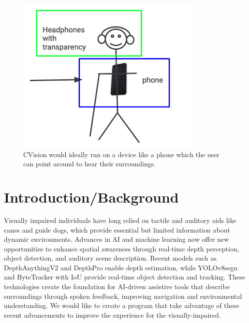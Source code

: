 \documentclass[12pt,a4paper]{article}
\begin{document}
\begin{figure}[ht!]
    \center
    \includegraphics[width=0.7\linewidth]{our_vision.png}
    \caption{CVision would ideally run on a device like a phone which the user can point around to hear their surroundings.}
    \label{our_vision}
  \end{figure}


\newpage
\section{Introduction/Background}
Visually impaired individuals have long relied on tactile and auditory aids like canes and guide dogs, which provide essential but limited information about dynamic environments.
Advances in AI and machine learning now offer new opportunities to enhance spatial awareness through real-time depth perception, object detection, and auditory scene description.
Recent models such as DepthAnythingV2 and DepthPro enable depth estimation, while YOLOv8segn and ByteTracker with IoU provide real-time object detection and tracking. These technologies create the foundation for AI-driven assistive tools that describe surroundings through spoken feedback, improving navigation and environmental understanding.
We would like to create a program that take advantage of these recent advancements to improve the experience for the visually-impaired.
\end{document}
